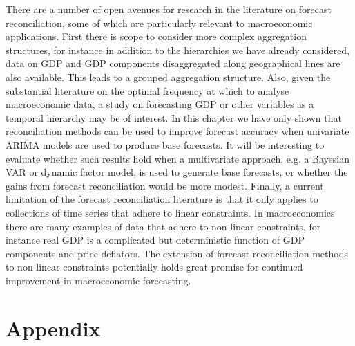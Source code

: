 \documentclass[graybox]{svmult}
\begin{document}
There are a number of open avenues for research in the literature on forecast reconciliation, some of which are particularly relevant to macroeconomic applications.  First there is scope to consider more complex aggregation structures, for instance in addition to the hierarchies we have already considered, data on GDP and GDP components disaggregated along geographical lines are also available.  This leads to a grouped aggregation structure.  Also, given the substantial literature on the optimal frequency at which to analyse macroeconomic data, a study on forecasting GDP or other variables as a temporal hierarchy may be of interest.  In this chapter we have only shown that reconciliation methods can be used to improve forecast accuracy when univariate ARIMA models are used to produce base forecasts.  It will be interesting to evaluate whether such results hold when a multivariate approach, e.g. a Bayesian VAR or dynamic factor model, is used to generate base forecasts, or whether the gains from forecast reconciliation would be more modest. Finally, a current limitation of the forecast reconciliation literature is that it only applies to collections of time series that adhere to linear constraints.  In macroeconomics there are many examples of data that adhere to non-linear constraints, for instance real GDP is a complicated but deterministic function of GDP components and price deflators.  The extension of forecast reconciliation methods to non-linear constraints potentially holds great promise for continued improvement in macroeconomic forecasting.

\clearpage






\clearpage

\section*{Appendix}
\end{document}
